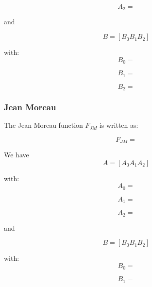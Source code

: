 \documentclass[a4paper]{article}
\begin{document}
\begin{equation}
  A_2 = 
\end{equation}

and

\begin{equation}
  B = \left[ B_0 B_1 B_2 \right]
\end{equation}

with:
\begin{equation}
  B_0 = 
\end{equation}

\begin{equation}
  B_1 = 
\end{equation}

\begin{equation}
  B_2 = 
\end{equation}

\subsubsection{Jean Moreau}
The Jean Moreau function $F_{JM}$ is written as:

\begin{equation}
  F_{JM} = 
\end{equation}

We have 
\begin{equation}
  A = \left[ A_0 A_1 A_2 \right]
\end{equation}

with:
\begin{equation}
  A_0 = 
\end{equation}

\begin{equation}
  A_1 = 
\end{equation}

\begin{equation}
  A_2 = 
\end{equation}

and

\begin{equation}
  B = \left[ B_0 B_1 B_2 \right]
\end{equation}

with:
\begin{equation}
  B_0 = 
\end{equation}

\begin{equation}
  B_1 = 
\end{equation}
\end{document}
